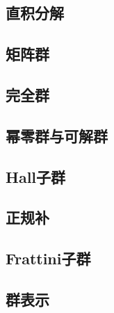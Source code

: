 \subsection{直积分解}

\subsection{矩阵群}

\subsection{完全群}

\subsection{幂零群与可解群}

\subsection{Hall子群}

\subsection{正规补}

\subsection{Frattini子群}

\subsection{群表示}
